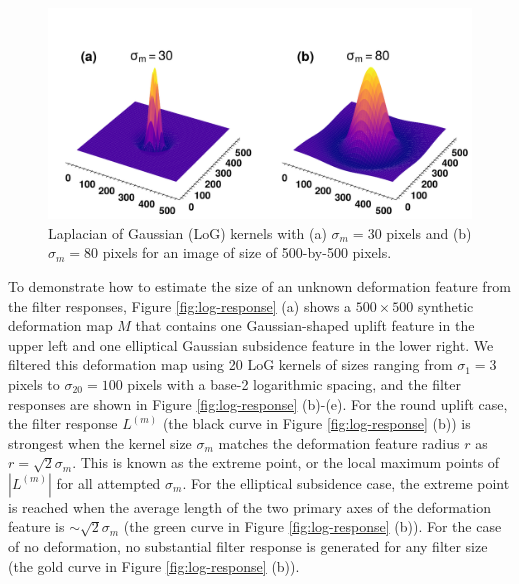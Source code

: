 \documentclass{utexasthesis}
\begin{document}
\begin{figure}[hbt!]
	\centering
	\includegraphics[width=0.98\linewidth]{paper2/figures/figure1_log_examples.pdf}
	\caption[Laplacian of Gaussian (LoG) kernels]{
		Laplacian of Gaussian (LoG) kernels with (a) $\sigma_m=30$ pixels and (b) $\sigma_m=80$ pixels for an image of size of 500-by-500 pixels.
	}
	\label{fig:log-kernel}
\end{figure}

To demonstrate how to estimate the size of an unknown deformation feature from the filter responses, Figure \ref{fig:log-response} (a) shows a $500 \times 500$ synthetic deformation map $M$ that contains one Gaussian-shaped uplift feature in the upper left and one elliptical Gaussian subsidence feature in the lower right. We filtered this deformation map using 20 LoG kernels of sizes ranging from $\sigma_1 = 3$ pixels to $\sigma_{20} = 100$ pixels with a base-2 logarithmic spacing, and the filter responses are shown in Figure \ref{fig:log-response} (b)-(e). For the round uplift case, the filter response $L^{(m)}$ (the black curve in Figure \ref{fig:log-response} (b)) is strongest when the kernel size $\sigma_m$ matches the deformation feature radius $r$ as $r = \sqrt{2}\sigma_m$. This is known as the extreme point, or the local maximum points of $|L^{(m)}|$ for all attempted $\sigma_m$. For the elliptical subsidence case, the extreme point is reached when the average length of the two primary axes of the deformation feature is $\sim \sqrt{2}\sigma_m$ (the green curve in Figure \ref{fig:log-response} (b)). For the case of no deformation, no substantial filter response is generated for any filter size (the gold curve in Figure \ref{fig:log-response} (b)).
\end{document}
